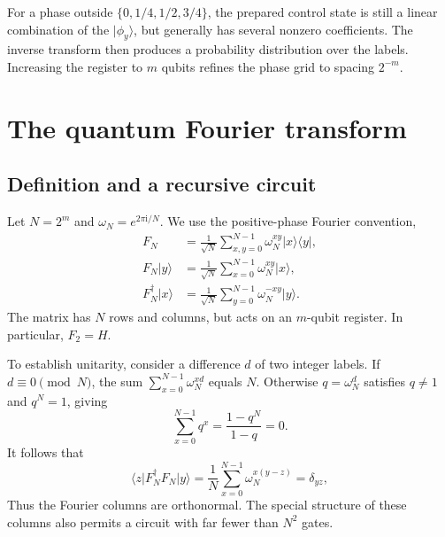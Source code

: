 \documentclass[11pt,oneside,openany]{book}
\providecommand{\ket}{}
\renewcommand{\ket}[1]{\lvert #1\rangle}
\providecommand{\bra}{}
\renewcommand{\bra}[1]{\langle #1\rvert}
\newcommand{\ketbra}[2]{\lvert #1\rangle\langle #2\rvert}
\newcommand{\ii}{\mathrm{i}}
\theoremstyle{definition}
\begin{document}
For a phase outside $\{0,1/4,1/2,3/4\}$, the prepared control state is still a linear combination of the $\ket{\phi_y}$, but generally has several nonzero coefficients. The inverse transform then produces a probability distribution over the labels. Increasing the register to $m$ qubits refines the phase grid to spacing $2^{-m}$.

\section{The quantum Fourier transform}

\subsection{Definition and a recursive circuit}

Let $N=2^m$ and $\omega_N=e^{2\pi\ii/N}$. We use the positive-phase Fourier convention,
\begin{align}
 F_N&=\frac1{\sqrt N}\sum_{x,y=0}^{N-1}\omega_N^{xy}\ketbra{x}{y},\\
 F_N\ket y&=\frac1{\sqrt N}\sum_{x=0}^{N-1}\omega_N^{xy}\ket x,\\
 F_N^{\dagger}\ket x&=\frac1{\sqrt N}\sum_{y=0}^{N-1}\omega_N^{-xy}\ket y.
 \label{eq:phase:qftdef}
\end{align}
The matrix has $N$ rows and columns, but acts on an $m$-qubit register. In particular, $F_2=H$.

To establish unitarity, consider a difference $d$ of two integer labels. If $d\equiv0\pmod N$, the sum $\sum_{x=0}^{N-1}\omega_N^{xd}$ equals $N$. Otherwise $q=\omega_N^d$ satisfies $q\ne1$ and $q^N=1$, giving
\begin{equation}
 \sum_{x=0}^{N-1}q^x=\frac{1-q^N}{1-q}=0.
\end{equation}
It follows that
\begin{equation}
 \bra z F_N^{\dagger}F_N\ket y
 =\frac1N\sum_{x=0}^{N-1}\omega_N^{x(y-z)}=\delta_{yz},
\end{equation}
Thus the Fourier columns are orthonormal. The special structure of these columns also permits a circuit with far fewer than $N^2$ gates.
\end{document}
